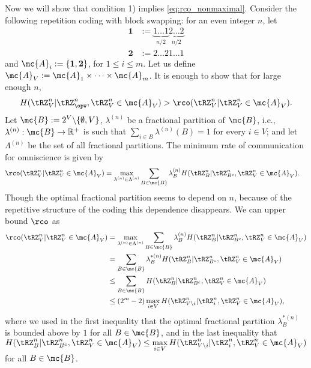 Now we will show  that condition 1) implies \eqref{eq:rco_nonmaximal}.
Consider the following repetition coding with block swapping: for an even integer $n$, let
 \begin{align*}
  \mathbf{1}&:=\underbrace{1\ldots 1}_{n/2}\underbrace{ 2\ldots 2}_{n/2}\\
  \mathbf{2}&:=2\ldots 2 1\ldots 1
 \end{align*}
 and $\mc{A}_{i}:=\{\mathbf{1},\mathbf{2}\}$, for $1\leq i\leq m$. Let us define $\mc{A}_{V}:=\mc{A}_{1}\times\cdots\times\mc{A}_{m}$. It is enough to show that for large enough $n$, 
\begin{align}\label{eq:non_maximal_1}
     H(\tRZ^n_V|\tRZ^n_{\opw},\tRZ^n_V\in \mc{A}_{V}) > \rco(\tRZ^n_V|\tRZ^n_V\in \mc{A}_{V}).
 \end{align}
 Let $\mc{B}:=2^V \backslash \{\emptyset, V\}$, $\lambda^{(n)}$ be a fractional partition of $\mc{B}$, i.e., $\lambda^{(n)}:\mc{B} \to \mathbb{R}^+$ is such that $\sum_{i\in B}\lambda^{(n)}(B)=1$ for every $i \in V$; and let $\Lambda^{(n)}$ be the set of all fractional partitions. The minimum rate of communication for omniscience \cite[Sec. V]{csiszar04} is given by
 \begin{align*} 
     &\rco(\tRZ^n_V|\tRZ^n_V\in \mc{A}_{V})%
     = \max \limits_{\lambda^{(n)} \in \Lambda^{(n)}} \sum \limits_{B \in \mc{B}} \lambda^{(n)}_B H(\tRZ^n_B|\tRZ^n_{B^c},\tRZ^n_V\in \mc{A}_{V}).
 \end{align*}
Though the optimal fractional partition seems to depend on $n$, because of the repetitive structure of the coding this dependence disappears. We can upper bound $\rco$ as 
 \begin{align}\label{eq:non_maximal_2}
  \rco(\tRZ^n_V|\tRZ^n_V\in \mc{A}_{V})\notag%
  &= \max \limits_{\lambda^{(n)} \in \Lambda^{(n)}} \sum \limits_{B \in \mc{B}} \lambda^{(n)}_B H(\tRZ^n_B|\tRZ^n_{B^c},\tRZ^n_V\in \mc{A}_{V})\notag\\
  &= \sum \limits_{B \in \mc{B}} \lambda^{*(n)}_B H(\tRZ^n_B|\tRZ^n_{B^c},\tRZ^n_V\in \mc{A}_{V})\notag\\
  &\leq \sum \limits_{B \in \mc{B}}H(\tRZ^n_B|\tRZ^n_{B^c},\tRZ^n_V\in \mc{A}_{V})\notag\\
  &\leq (2^{m}-2)\max \limits_{i \in V} H(\tRZ^n_{V \backslash i}|\tRZ^n_{i},\tRZ^n_V\in \mc{A}_{V}),
 \end{align}
 where we used in the first inequality that the optimal fractional partition $\lambda^{*(n)}_B$ is bounded above by $1$ for all $B \in \mc{B}$, and in the last inequality that  $H(\tRZ^n_B|\tRZ^n_{B^c},\tRZ^n_V\in \mc{A}_{V}) \leq \max \limits_{i \in V} H(\tRZ^n_{V \backslash i}|\tRZ^n_{i},\tRZ^n_V\in \mc{A}_{V})$ for all $B \in \mc{B}$.\\
 
